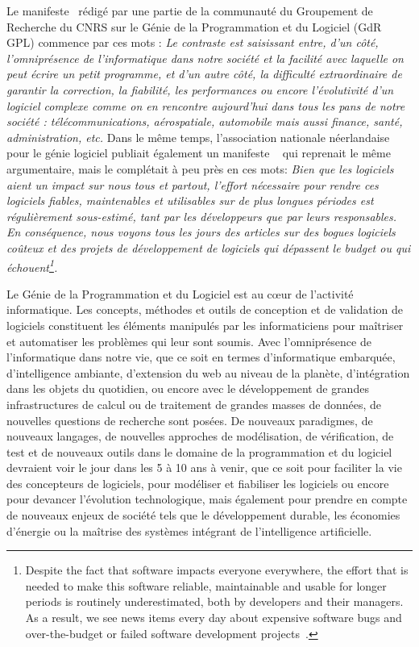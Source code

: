 \documentclass[11pt]{article}
\newcommand{\GDR}{GdR\xspace}
\begin{document}
Le manifeste~\cite{manifeste} rédigé par une partie de la communauté du Groupement de Recherche du CNRS sur le Génie de la Programmation et du Logiciel ({\GDR} GPL) commence par ces mots : \emph{Le contraste est saisissant entre, d’un côté, l’omniprésence de l’informatique dans notre
société et la facilité avec laquelle on peut écrire un petit programme, et d’un autre côté, la difficulté extraordinaire de garantir la correction, la fiabilité, les performances ou encore
l’évolutivité d’un logiciel complexe comme on en rencontre aujourd’hui dans tous les pans
de notre société : télécommunications, aérospatiale, automobile mais aussi finance, santé,
administration, etc. }
Dans le même temps, l'association nationale néerlandaise pour le génie logiciel publiait également un manifeste ~\cite{Nederland2019} qui reprenait le même argumentaire, mais le complétait à peu près en ces mots:  \emph{Bien que les logiciels aient un impact sur nous tous et partout, l'effort nécessaire pour rendre ces logiciels fiables, maintenables et utilisables sur de plus longues périodes est régulièrement sous-estimé, tant par les développeurs que par leurs responsables. En conséquence, nous voyons tous les jours des articles sur des bogues logiciels coûteux et des projets de développement de logiciels qui dépassent le budget ou qui échouent\footnote{Despite the fact that software impacts everyone everywhere, the effort that is needed to make this software reliable,
maintainable and usable for longer periods is routinely underestimated, both by developers and their managers. As a result,
we see news items every day about expensive software bugs and over-the-budget or failed software development projects~\cite{Nederland2019}.}.}


Le Génie de la Programmation et du Logiciel est au c{\oe}ur de l'activité
informatique. Les concepts, méthodes et outils de conception et de
validation de logiciels constituent les éléments manipulés par les
informaticiens pour maîtriser et automatiser les problèmes qui leur sont 
soumis. Avec l'omniprésence de l'informatique dans notre vie,  que ce soit en termes
d'informatique embarquée, d'intelligence ambiante, d'extension du web au niveau
de la planète, d'intégration dans les objets du quotidien, ou encore avec le
développement de grandes infrastructures de calcul ou de traitement de grandes
masses de données, de nouvelles questions de recherche sont posées.
De nouveaux paradigmes, de nouveaux langages, de nouvelles approches de
modélisation, de vérification, de test et de nouveaux outils dans le domaine
de la programmation et du logiciel devraient voir le jour dans les 5 à 10 ans à
venir, que ce soit pour faciliter la vie des concepteurs de logiciels, pour
modéliser et fiabiliser les logiciels ou encore pour devancer l'évolution
technologique, mais également pour prendre en compte de nouveaux enjeux de
société tels que le développement durable, les économies d'énergie ou la maîtrise des systèmes intégrant de l'intelligence artificielle.
\end{document}
